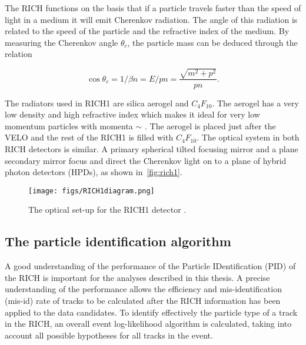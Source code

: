 The RICH functions on the basis that if a particle travels faster than the speed of light in a medium it will emit Cherenkov radiation. The angle of this radiation is related to the speed of the particle and the refractive index of the medium.  By measuring the Cherenkov angle $\theta_{c}$, the particle mass can be deduced through the relation

\begin{equation}
  \cos\theta_{c} = 1/\beta n  = E/pn =  \frac{\sqrt{m^{2} + p^{2}}}{pn}.
\end{equation}

The radiators used in RICH1 are silica aerogel and $C_{4}F_{10}$. The aerogel has a very low density and high refractive index which makes it ideal for very low momentum particles with momenta $\sim$ \gevc. The aerogel is placed just after the VELO and the rest of the RICH1 is filled with $C_{4}F_{10}$. The optical system in both RICH detectors is similar. A primary spherical tilted focusing mirror and a plane secondary mirror focus and direct the Cherenkov light on to a plane of hybrid photon detectors (HPDs), as shown in~\autoref{fig:rich1}.


\begin{figure}[h!]
  \centering
  \texttt{[image: figs/RICH1diagram.png]} 
  \caption{The optical set-up for the RICH1 detector \cite{rich1dia}.
  }
  \label{fig:rich1}
\end{figure}


\subsection{The particle identification algorithm}
A good understanding of the performance of the Particle IDentification (\Gls{PID}) of the RICH is important for the analyses described in this thesis. A precise understanding of the performance  allows the efficiency and mis-identification (mis-id) rate of tracks to be calculated after the RICH information has been applied to the data candidates. To identify effectively the particle type of a track in the RICH, an overall event log-likelihood algorithm is calculated, taking into account all possible hypotheses for all tracks in the event. %

